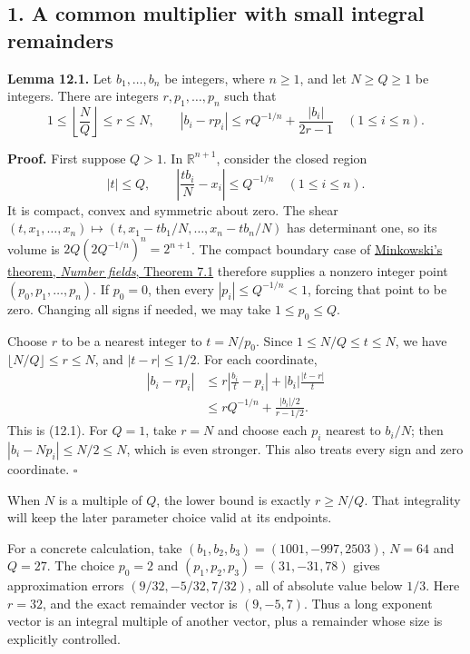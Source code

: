 \documentclass[
  11pt,
  a4paper,
]{article}
\begin{document}
\subsection{1. A common multiplier with small integral
remainders}\label{a-common-multiplier-with-small-integral-remainders}

\textbf{Lemma 12.1.} Let \(b_1,\ldots,b_n\) be integers, where
\(n\ge1\), and let \(N\ge Q\ge1\) be integers. There are integers
\(r,p_1,\ldots,p_n\) such that \[
1\le\left\lfloor\frac NQ\right\rfloor\le r\le N,
\qquad
|b_i-rp_i|\le rQ^{-1/n}+\frac{|b_i|}{2r-1}
\quad(1\le i\le n).
\tag{12.1}
\]

\textbf{Proof.} First suppose \(Q>1\). In \(\mathbb R^{n+1}\), consider
the closed region \[
|t|\le Q,\qquad
\left|\frac{tb_i}{N}-x_i\right|\le Q^{-1/n}
\quad(1\le i\le n).
\tag{12.2}
\] It is compact, convex and symmetric about zero. The shear
\((t,x_1,\ldots,x_n)\mapsto(t,x_1-tb_1/N,\ldots,x_n-tb_n/N)\) has
determinant one, so its volume is \(2Q(2Q^{-1/n})^n=2^{n+1}\). The
compact boundary case of
\href{https://kokunoyumeto.github.io/open-math-courses-public/courses/NT-ANT/lattices-minkowskis-theorem-and-the-minkowski-embedding.html\#from-two-points-to-a-nonzero-lattice-point}{Minkowski's
theorem, \emph{Number fields}, Theorem 7.1} therefore supplies a nonzero
integer point \((p_0,p_1,\ldots,p_n)\). If \(p_0=0\), then every
\(|p_i|\le Q^{-1/n}<1\), forcing that point to be zero. Changing all
signs if needed, we may take \(1\le p_0\le Q\).

Choose \(r\) to be a nearest integer to \(t=N/p_0\). Since
\(1\le N/Q\le t\le N\), we have \(\lfloor N/Q\rfloor\le r\le N\), and
\(|t-r|\le1/2\). For each coordinate, \[
\begin{aligned}
|b_i-rp_i|
&\le r\left|\frac{b_i}{t}-p_i\right|
       +|b_i|\frac{|t-r|}{t}\\
&\le rQ^{-1/n}+\frac{|b_i|/2}{r-1/2}.
\end{aligned}
\] This is (12.1). For \(Q=1\), take \(r=N\) and choose each \(p_i\)
nearest to \(b_i/N\); then \(|b_i-Np_i|\le N/2\le N\), which is even
stronger. This also treats every sign and zero coordinate. \(\square\)

When \(N\) is a multiple of \(Q\), the lower bound is exactly
\(r\ge N/Q\). That integrality will keep the later parameter choice
valid at its endpoints.

For a concrete calculation, take \((b_1,b_2,b_3)=(1001,-997,2503)\),
\(N=64\) and \(Q=27\). The choice \(p_0=2\) and
\((p_1,p_2,p_3)=(31,-31,78)\) gives approximation errors
\((9/32,-5/32,7/32)\), all of absolute value below \(1/3\). Here
\(r=32\), and the exact remainder vector is \((9,-5,7)\). Thus a long
exponent vector is an integral multiple of another vector, plus a
remainder whose size is explicitly controlled.
\end{document}
